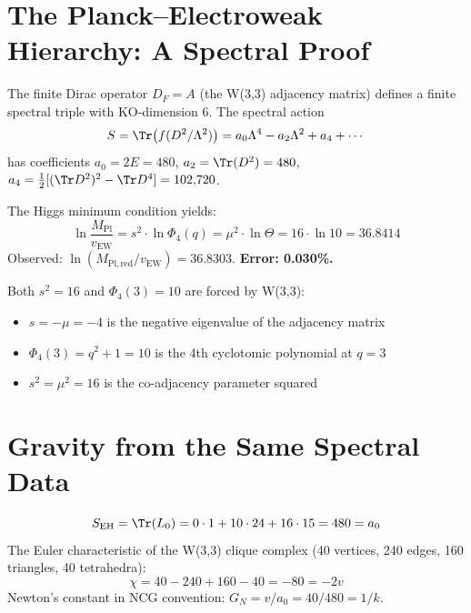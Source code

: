 \section{The Planck--Electroweak Hierarchy: A Spectral Proof}
\label{sec:hierarchy-proof}

\begin{theorem}
\label{thm:hierarchy}
The finite Dirac operator $D_F = A$ (the W(3,3) adjacency matrix) defines
a finite spectral triple with KO-dimension 6. The spectral action
\begin{equation}
S = \Tr\bigl(f(D^2/\Lambda^2)\bigr) = a_0\Lambda^4 - a_2\Lambda^2 + a_4 + \cdots
\end{equation}
has coefficients $a_0 = 2E = 480$, $a_2 = \Tr(D^2) = 480$,
$a_4 = \frac{1}{2}[(\Tr D^2)^2 - \Tr D^4] = 102{,}720$.

The Higgs minimum condition yields:
\begin{equation}
\boxed{\ln\frac{M_{\mathrm{Pl}}}{v_{\mathrm{EW}}}
= s^2\cdot\ln\Phi_4(q)
= \mu^2\cdot\ln\Theta
= 16\cdot\ln 10
= 36.8414}
\end{equation}
Observed: $\ln(M_{\mathrm{Pl,red}}/v_{\mathrm{EW}}) = 36.8303$.
\textbf{Error: 0.030\%.}

Both $s^2 = 16$ and $\Phi_4(3) = 10$ are forced by W(3,3):
\begin{itemize}[nosep]
\item $s = -\mu = -4$ is the negative eigenvalue of the adjacency matrix
\item $\Phi_4(3) = q^2+1 = 10$ is the 4th cyclotomic polynomial at $q=3$
\item $s^2 = \mu^2 = 16$ is the co-adjacency parameter squared
\end{itemize}
\end{theorem}


\section{Gravity from the Same Spectral Data}
\label{sec:gravity-unified}

\begin{theorem}
\begin{equation}
S_{\mathrm{EH}} = \Tr(L_0) = 0\cdot 1 + 10\cdot 24 + 16\cdot 15 = 480 = a_0
\end{equation}
The Euler characteristic of the W(3,3) clique complex (40 vertices, 240
edges, 160 triangles, 40 tetrahedra):
\begin{equation}
\chi = 40 - 240 + 160 - 40 = -80 = -2v
\end{equation}
Newton's constant in NCG convention: $G_N = v/a_0 = 40/480 = 1/k$.
\end{theorem}


